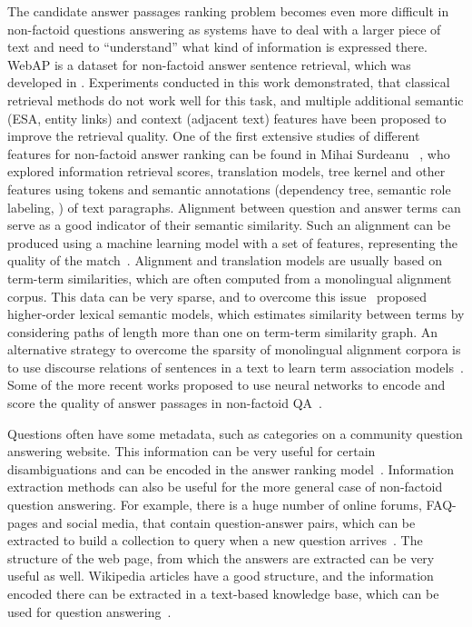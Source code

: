 The candidate answer passages ranking problem becomes even more difficult in non-factoid questions answering as systems have to deal with a larger piece of text and need to ``understand'' what kind of information is expressed there.
WebAP is a dataset for non-factoid answer sentence retrieval, which was developed in \cite{yang2016beyond}.
Experiments conducted in this work demonstrated, that classical retrieval methods do not work well for this task, and multiple additional semantic (ESA, entity links) and context (adjacent text) features have been proposed to improve the retrieval quality.
One of the first extensive studies of different features for non-factoid answer ranking can be found in Mihai Surdeanu \etal~\cite{surdeanu2011learning}, who explored information retrieval scores, translation models, tree kernel and other features using tokens and semantic annotations (dependency tree, semantic role labeling, \etc) of text paragraphs.
Alignment between question and answer terms can serve as a good indicator of their semantic similarity.
Such an alignment can be produced using a machine learning model with a set of features, representing the quality of the match~\cite{wang2015faq}.
Alignment and translation models are usually based on term-term similarities, which are often computed from a monolingual alignment corpus.
This data can be very sparse, and to overcome this issue~\cite{fried2015higher} proposed higher-order lexical semantic models, which estimates similarity between terms by considering paths of length more than one on term-term similarity graph.
An alternative strategy to overcome the sparsity of monolingual alignment corpora is to use discourse relations of sentences in a text to learn term association models~\cite{sharp2015spinning}.
Some of the more recent works proposed to use neural networks to encode and score the quality of answer passages in non-factoid QA~\cite{cohen2016end,yang2016anmm}.

Questions often have some metadata, such as categories on a community question answering website.
This information can be very useful for certain disambiguations and can be encoded in the answer ranking model~\cite{zhou2015learning}.
Information extraction methods can also be useful for the more general case of non-factoid question answering.
For example, there is a huge number of online forums, FAQ-pages and social media, that contain question-answer pairs, which can be extracted to build a collection to query when a new question arrives~\cite{cong2008finding,ding2008using,Jijkoun:2005:RAF:1099554.1099571,li2011question,Yang:2009:ISK:1526709.1526735}.
The structure of the web page, from which the answers are extracted can be very useful as well.
Wikipedia articles have a good structure, and the information encoded there can be extracted in a text-based knowledge base, which can be used for question answering~\cite{sondhi2014mining}.

